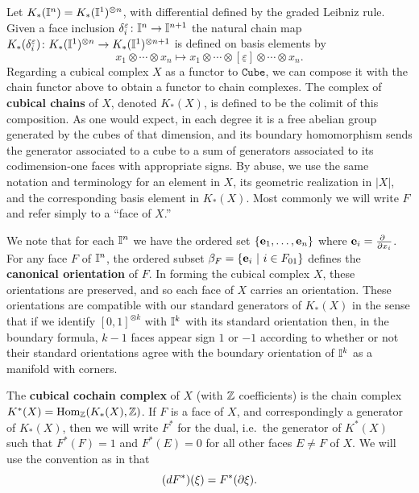Let $K_*(\mathbb{I}^n) = K_*(\mathbb{I}^1)^{ \otimes n}$, with differential defined by the graded Leibniz rule.
Given a face inclusion $\delta_i^{\varepsilon} \colon \mathbb{I}^n \to \mathbb{I}^{n+1}$ the natural chain map $K_*(\delta_i^{\varepsilon}) \colon K_*(\mathbb{I}^1)^{ \otimes n} \to K_*(\mathbb{I}^1)^{ \otimes n+1}$ is defined on basis elements by
\begin{equation*}
x_1 \otimes \cdots \otimes x_n \mapsto
x_1 \otimes \cdots \otimes [\underline{\varepsilon}] \otimes \cdots \otimes x_n.
\end{equation*}
Regarding a cubical complex $X$ as a functor to $\mathtt{Cube}$, we can compose it with the chain functor above to obtain a functor to chain complexes.
The complex of \textbf{cubical chains} of $X$, denoted $K_*(X)$, is defined to be the colimit of this composition.
As one would expect, in each degree it is a free abelian group generated by the cubes of that dimension, and its boundary homomorphism sends the
generator associated to a cube to a sum of generators associated to its codimension-one faces with appropriate signs. By abuse, we use the same notation and terminology for an element in $X$, its geometric realization in $|X|$,
and the corresponding basis element in $K_*(X)$. Most commonly we will write $F$ and refer simply to a ``face of $X$.''

We note that for each $\mathbb{I}^n$ we have the ordered set $\{\mathbf{e}_1, \dots, \mathbf{e}_n\}$ where $\mathbf{e}_i = \frac{\partial\ }{\partial x_i}$.
For any face $F$ of $\mathbb{I}^n$, the ordered subset $\beta_F = \{\mathbf{e}_i\ |\ i \in F_{01}\}$ defines the \textbf{canonical orientation} of $F$. In forming the cubical complex $X$, these orientations are preserved, and so each face of $X$ carries an orientation. These orientations are compatible with our standard generators of $K_*(X)$ in the sense that if we identify $[0,1]^{ \otimes k}$ with $\mathbb{I}^k$ with its standard orientation then, in the boundary formula, $k-1$ faces appear sign $1$ or $-1$ according to whether or not their standard orientations agree with the boundary orientation of $\mathbb{I}^k$ as a manifold with corners.

The \textbf{cubical cochain complex} of $X$ (with $\mathbb{Z}$ coefficients) is the chain complex $K^*(X) = \textup{Hom}_{\mathbb{Z}}(K_*(X), \mathbb{Z})$. If $F$ is a face of $X$, and correspondingly a generator of $K_*(X)$, then we will write $F^*$ for the dual, i.e.\ the generator of $K^*(X)$ such that $F^*(F) = 1$ and $F^*(E) = 0$ for all other faces $E\neq F$ of $X$. We will use the convention as in \cite{Mun84} that
$$(dF^*)(\xi) = F^*(\partial \xi).$$

